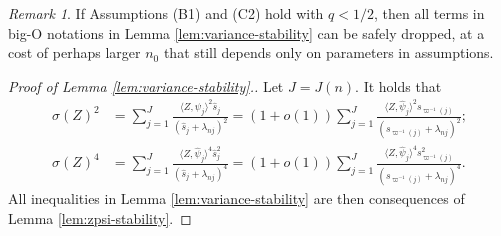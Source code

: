 \documentclass[11pt,a4paper]{article}
\renewcommand{\hat}{\widehat}
\theoremstyle{definition}
\theoremstyle{plain}
\theoremstyle{remark}
\newtheorem{remark}{Remark}[section]
\begin{document}
\begin{remark}
If Assumptions (B1) and (C2) hold with $q<1/2$, then all terms in big-O notations in Lemma \ref{lem:variance-stability} can be safely dropped, at a cost of perhaps larger $n_0$ that still depends only on parameters in assumptions.
\end{remark}

\begin{proof}[Proof of Lemma \ref{lem:variance-stability}.]
Let $J=J(n)$.
It holds that
\begin{align*}
\sigma(Z)^2 &= \sum_{j=1}^J \frac{\langle Z,\hat\psi_j\rangle^2\hat s_j}{(\hat s_j+\lambda_{nj})^2} = (1+o(1))\sum_{j=1}^J\frac{\langle Z,\hat\psi_j\rangle^2 s_{\varpi^{-1}(j)}}{(s_{\varpi^{-1}(j)}+\lambda_{nj})^2};\\
\sigma(Z)^4 &= \sum_{j=1}^J\frac{\langle Z,\hat\psi_j\rangle^4\hat s_j^2}{(\hat s_j+\lambda_{nj})^4} = (1+o(1))\sum_{j=1}^J\frac{\langle Z,\hat\psi_j\rangle^4 s_{\varpi^{-1}(j)}^2}{(s_{\varpi^{-1}(j)}+\lambda_{nj})^4}.
\end{align*}
All inequalities in Lemma \ref{lem:variance-stability} are then consequences of Lemma \ref{lem:zpsi-stability}.
\end{proof}
\end{document}

